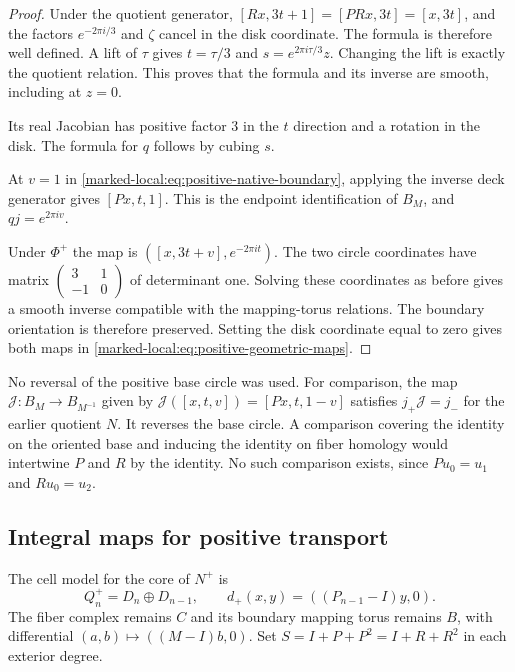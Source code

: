 \begin{proof}
Under the quotient generator,
$[Rx,3t+1]=[PRx,3t]=[x,3t]$, and the factors
$e^{-2\pi i/3}$ and $\zeta$ cancel in the disk coordinate.
The formula is therefore well defined. A lift of $\tau$ gives
$t=\tau/3$ and $s=e^{2\pi i\tau/3}z$. Changing the lift is exactly
the quotient relation. This proves that the formula and its inverse
are smooth, including at $z=0$.

Its real Jacobian has positive
factor $3$ in the $t$ direction and a rotation in the disk.
The formula for $q$ follows by cubing $s$.

At $v=1$ in \eqref{marked-local:eq:positive-native-boundary}, applying the inverse
deck generator gives $[Px,t,1]$. This is the endpoint identification
of $B_M$, and $qj=e^{2\pi iv}$.

Under $\Phi^+$ the map is
$([x,3t+v],e^{-2\pi it})$. The two circle coordinates have matrix
$\left(\begin{smallmatrix}3&1\\-1&0\end{smallmatrix}\right)$
of determinant one. Solving these coordinates as before gives a
smooth inverse compatible with the mapping-torus relations.
The boundary orientation is therefore preserved. Setting the disk
coordinate equal to zero gives both maps in
\eqref{marked-local:eq:positive-geometric-maps}.
\end{proof}

No reversal of the positive base circle was used. For comparison,
the map $\mathcal J:B_M\to B_{M^{-1}}$ given by
$\mathcal J([x,t,v])=[Px,t,1-v]$ satisfies
$j_+\mathcal J=j_-$ for the earlier quotient $N$. It reverses the
base circle. A comparison covering the identity on the oriented base and inducing
the identity on fiber homology would intertwine $P$ and $R$ by the identity.
No such comparison exists, since $Pu_0=u_1$ and $Ru_0=u_2$.

\subsection{Integral maps for positive transport}

The cell model for the core of $N^+$ is
\begin{equation}\label{marked-local:eq:Q-positive}
 Q^+_n=D_n\oplus D_{n-1},\qquad
 d_+(x,y)=((P_{n-1}-I)y,0).
\end{equation}
The fiber complex remains $C$ and its boundary mapping torus remains
$B$, with differential $(a,b)\mapsto((M-I)b,0)$.
Set $S=I+P+P^2=I+R+R^2$ in each exterior degree.

